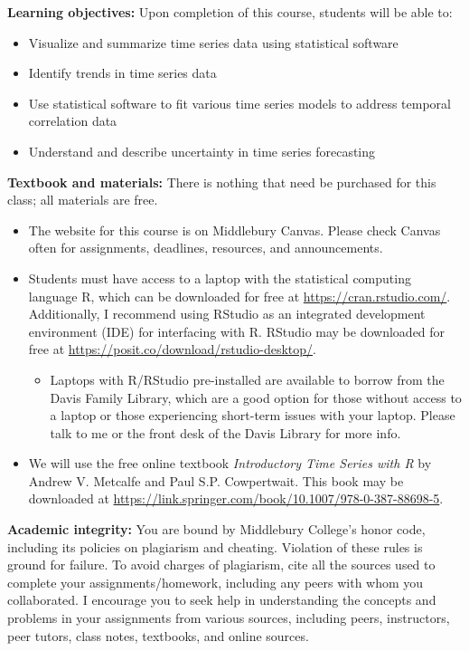 \documentclass[11pt, a4paper]{article}
\begin{document}
\vspace{4mm}

\noindent \textbf{Learning objectives:} Upon completion of this course,
students will be able to:

\begin{itemize}
\item Visualize and summarize time series data using statistical software
\item Identify trends in time series data
\item   Use statistical software to fit various time series models to address temporal correlation data
\item Understand and describe uncertainty in time series forecasting
\end{itemize}

\noindent \textbf{Textbook and materials:} There is nothing that need be
purchased for this class; all materials are free.

\begin{itemize}
\item The website for this course is on Middlebury Canvas. Please check Canvas often for assignments, deadlines, resources, and announcements. 
\item Students must have access to a laptop with the statistical computing language R, which can be downloaded for free at \href{https://cran.rstudio.com/}{https://cran.rstudio.com/}. Additionally, I recommend using RStudio as an integrated development environment (IDE) for interfacing with R. RStudio may be downloaded for free at \href{https://posit.co/download/rstudio-desktop/}{https://posit.co/download/rstudio-desktop/}.
\begin{itemize}
\item Laptops with R/RStudio pre-installed are available to borrow from the Davis Family Library, which are a good option for those without access to a laptop or those experiencing short-term issues with your laptop. Please talk to me or the front desk of the Davis Library for more info.  
\end{itemize}
\item We will use the free online textbook \textit{Introductory Time Series with R} by Andrew V. Metcalfe and Paul S.P. Cowpertwait. This book may be downloaded at \href{https://link.springer.com/book/10.1007/978-0-387-88698-5}{https://link.springer.com/book/10.1007/978-0-387-88698-5}.
\end{itemize}

\noindent \textbf{Academic integrity:} You are bound by Middlebury
College's honor code, including its policies on plagiarism and cheating.
Violation of these rules is ground for failure. To avoid charges of
plagiarism, cite all the sources used to complete your
assignments/homework, including any peers with whom you collaborated. I
encourage you to seek help in understanding the concepts and problems in
your assignments from various sources, including peers, instructors,
peer tutors, class notes, textbooks, and online sources.
\end{document}
